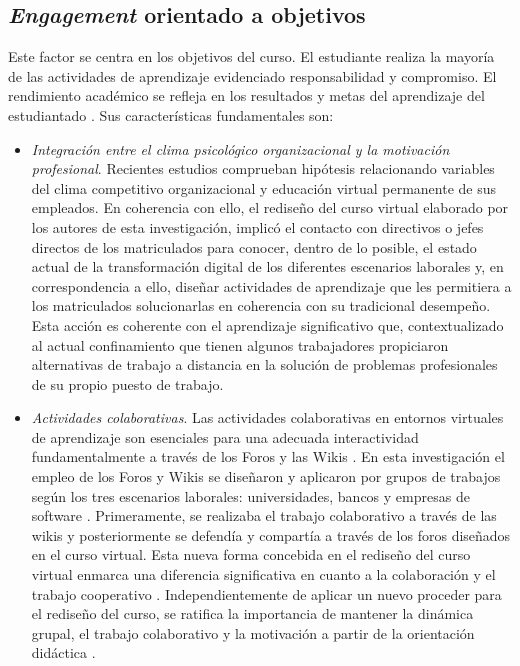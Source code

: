 \documentclass[spanish]{textolivre}
\begin{document}
\subsection{\emph{Engagement} orientado a objetivos}
Este factor se centra en los objetivos del curso. El estudiante realiza la mayoría de las actividades de aprendizaje evidenciado responsabilidad y compromiso. El rendimiento académico se refleja en los resultados y metas del aprendizaje del estudiantado \cite{stack2015}. %
Sus características fundamentales son:

\begin{itemize}
    \item \emph{Integración entre el clima psicológico organizacional y la motivación profesional}. Recientes estudios \cite{li2020} %
    comprueban hipótesis relacionando variables del clima competitivo organizacional y educación virtual permanente de sus empleados. En coherencia con ello, el rediseño del curso virtual elaborado por los autores de esta investigación, implicó el contacto con directivos o jefes directos de los matriculados para conocer, dentro de lo posible, el estado actual de la transformación digital de los diferentes escenarios laborales y, en correspondencia a ello, diseñar actividades de aprendizaje que les permitiera a los matriculados solucionarlas en coherencia con su tradicional desempeño. Esta acción es coherente con el aprendizaje significativo \cite{cardona2015} %
    que, contextualizado al actual confinamiento que tienen algunos trabajadores propiciaron alternativas de trabajo a distancia en la solución de problemas profesionales de su propio puesto de trabajo.
    
    \item \emph{Actividades colaborativas}. Las actividades colaborativas en entornos virtuales de aprendizaje son esenciales para una adecuada interactividad fundamentalmente a través de los Foros y las Wikis \cite{lin2020}. %
    En esta investigación el empleo de los Foros y Wikis se diseñaron y aplicaron por grupos de trabajos según los tres escenarios laborales: universidades, bancos y empresas de software . Primeramente, se realizaba el trabajo colaborativo a través de las wikis y posteriormente se defendía y compartía a través de los foros diseñados en el curso virtual. Esta nueva forma concebida en el rediseño del curso virtual enmarca una diferencia significativa en cuanto a la colaboración y el trabajo cooperativo . Independientemente de aplicar un nuevo proceder para el rediseño del curso, se ratifica la importancia de mantener la dinámica grupal, el trabajo colaborativo y la motivación a partir de la orientación didáctica \cite{bakker2018, mohd2020, eltahir2021}. %

\end{itemize}
\end{document}
